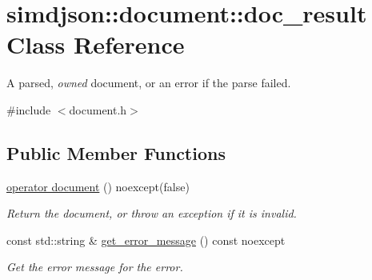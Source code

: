 \hypertarget{classsimdjson_1_1document_1_1doc__result}{}\section{simdjson\+:\+:document\+:\+:doc\+\_\+result Class Reference}
\label{classsimdjson_1_1document_1_1doc__result}


A parsed, {\itshape owned} document, or an error if the parse failed.  




{\ttfamily \#include $<$document.\+h$>$}

\subsection*{Public Member Functions}
\begin{DoxyCompactItemize}
\item 
\hyperlink{classsimdjson_1_1document_1_1doc__result_a4958f62dceafeea28b8b5915871de9d7}{operator document} () noexcept(false)
\begin{DoxyCompactList}\small\item\em Return the document, or throw an exception if it is invalid. \end{DoxyCompactList}\item 
\mbox{\label{classsimdjson_1_1document_1_1doc__result_aec859cce636b118c0fa06c71e07549d9}} 
const std\+::string \& \hyperlink{classsimdjson_1_1document_1_1doc__result_aec859cce636b118c0fa06c71e07549d9}{get\+\_\+error\+\_\+message} () const noexcept
\begin{DoxyCompactList}\small\item\em Get the error message for the error. \end{DoxyCompactList}\end{DoxyCompactItemize}
